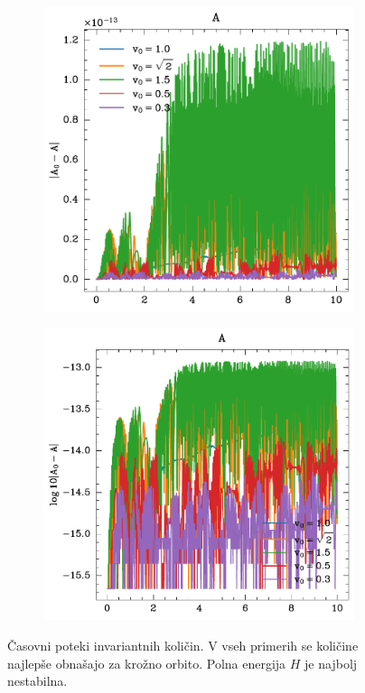 \begin{figure}
    \begin{subfigure}{0.49\textwidth}
        \includegraphics[width=\textwidth]{../images/1-1-A_lin.pdf}
    \end{subfigure}
    \hfill
    \begin{subfigure}{0.49\textwidth}
        \includegraphics[width=\textwidth]{../images/1-1-A_log.pdf}
    \end{subfigure}
    \caption{Časovni poteki invariantnih količin. V vseh primerih se količine najlepše obnašajo za krožno orbito. Polna energija $H$ je najbolj nestabilna.}

\end{figure}

